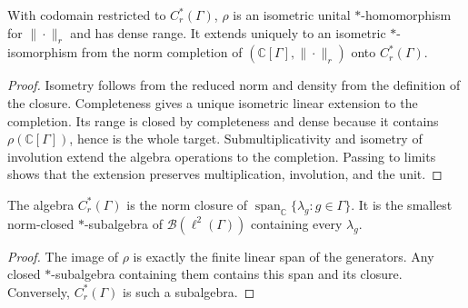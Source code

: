 \begin{proposition}\label{prop:reduced-group-cstar-completion}
\leanok
{}
With codomain restricted to $C_r^*(\Gamma)$, $\rho$ is an isometric
unital $*$-homomorphism for $\|\cdot\|_r$ and has dense range.
It extends uniquely to an isometric $*$-isomorphism from the norm
completion of $(\mathbb C[\Gamma],\|\cdot\|_r)$ onto $C_r^*(\Gamma)$.
\end{proposition}
\begin{proof}
\leanok
Isometry follows from the reduced norm and density from the definition
of the closure. Completeness gives a unique isometric linear extension
to the completion. Its range is closed by completeness and dense because
it contains $\rho(\mathbb C[\Gamma])$, hence is the whole target.
Submultiplicativity and isometry of involution extend the algebra
operations to the completion. Passing to limits shows that the extension
preserves multiplication, involution, and the unit.
\end{proof}

\begin{proposition}\label{prop:reduced-group-cstar-generated}
\leanok
{}
The algebra $C_r^*(\Gamma)$ is the norm closure of
$\operatorname{span}_{\mathbb C}\{\lambda_g:g\in\Gamma\}$.
It is the smallest norm-closed $*$-subalgebra of
$\mathcal B(\ell^2(\Gamma))$ containing every $\lambda_g$.
\end{proposition}
\begin{proof}
\leanok
The image of $\rho$ is exactly the finite linear span of the generators.
Any closed $*$-subalgebra containing them contains this span and its
closure. Conversely, $C_r^*(\Gamma)$ is such a subalgebra.
\end{proof}

